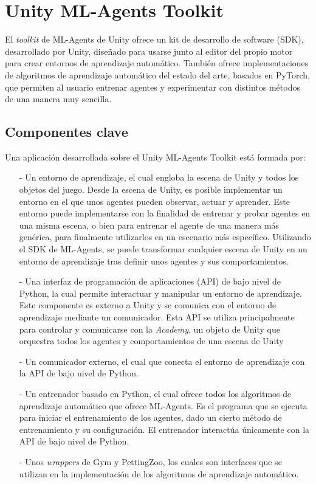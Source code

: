 \section{Unity ML-Agents Toolkit}

El \emph{toolkit} de ML-Agents de Unity ofrece un kit de desarrollo de software (SDK), desarrollado por Unity, diseñado para usarse junto al editor del propio motor para crear entornos de aprendizaje automático. También ofrece implementaciones de algoritmos de aprendizaje automático del estado del arte, basados en PyTorch, que permiten al usuario entrenar agentes y experimentar con distintos métodos de una manera muy sencilla.

\subsection{Componentes clave}

Una aplicación desarrollada sobre el Unity ML-Agents Toolkit está formada por:
\begin{enumerate}
    \item[-] Un entorno de aprendizaje, el cual engloba la escena de Unity y todos los objetos del juego. Desde la escena de Unity, es posible implementar un entorno en el que unos agentes pueden observar, actuar y aprender. Este entorno puede implementarse con la finalidad de entrenar y probar agentes en una misma escena, o bien para entrenar el agente de una manera más genérica, para finalmente utilizarlos en un escenario más específico. Utilizando el SDK de ML-Agents, se puede transformar cualquier escena de Unity en un entorno de aprendizaje tras definir unos agentes y sus comportamientos.
    \item[-] Una interfaz de programación de aplicaciones (API) de bajo nivel de Python, la cual permite interactuar y manipular un entorno de aprendizaje. Este componente es externo a Unity y se comunica con el entorno de aprendizaje mediante un comunicador. Esta API se utiliza principalmente para controlar y comunicarse con la \emph{Academy}, un objeto de Unity que orquestra todos los agentes y comportamientos de una escena de Unity
    \item[-] Un comunicador externo, el cual que conecta el entorno de aprendizaje con la API de bajo nivel de Python.
    \item[-] Un entrenador basado en Python, el cual ofrece todos los algoritmos de aprendizaje automático que ofrece ML-Agents. Es el programa que se ejecuta para iniciar el entrenamiento de los agentes, dado un cierto método de entrenamiento y su configuración. El entrenador interactúa únicamente con la API de bajo nivel de Python.
    \item[-] Unos \emph{wrappers} de Gym y PettingZoo, los cuales son interfaces que se utilizan en la implementación de los algoritmos de aprendizaje automático.
\end{enumerate}

